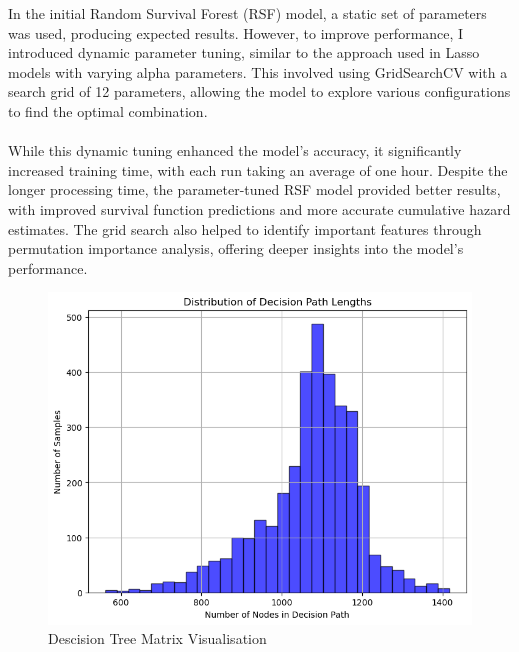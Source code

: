 In the initial Random Survival Forest (RSF) model, a static set of parameters was used, producing expected results. However, to improve performance, I introduced dynamic parameter tuning, similar to the approach used in Lasso models with varying alpha parameters. This involved using GridSearchCV with a search grid of 12 parameters, allowing the model to explore various configurations to find the optimal combination.
\\\\
\noindent While this dynamic tuning enhanced the model's accuracy, it significantly increased training time, with each run taking an average of one hour. Despite the longer processing time, the parameter-tuned RSF model provided better results, with improved survival function predictions and more accurate cumulative hazard estimates. The grid search also helped to identify important features through permutation importance analysis, offering deeper insights into the model's performance.
\begin{figure}[h]
    \centering
    \includegraphics[scale=0.6]{Figures/SURV/rsf_paths.png}
    \caption{Descision Tree Matrix Visualisation}
    \label{fig:des_path}
\end{figure}

